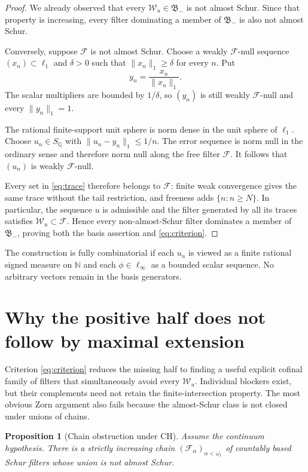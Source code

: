 \documentclass[10pt]{article}
\newtheorem{proposition}[theorem]{Proposition}
\newcommand{\N}{\mathbb N}
\newcommand{\Q}{\mathbb Q}
\newcommand{\F}{\mathcal F}
\newcommand{\W}{\mathcal W}
\newcommand{\ellone}{\ell_1}
\begin{document}
\begin{proof}
We already observed that every $\W_u\in\mathfrak B_-$ is not almost Schur.
Since that property is increasing, every filter dominating a member of
$\mathfrak B_-$ is also not almost Schur.

Conversely, suppose $\F$ is not almost Schur.  Choose a weakly
$\F$-null sequence $(x_n)\subset\ellone$ and $\delta>0$ such that
$\|x_n\|_1\ge\delta$ for every $n$.  Put
\[
 y_n=\frac{x_n}{\|x_n\|_1}.
\]
The scalar multipliers are bounded by $1/\delta$, so $(y_n)$ is still weakly
$\F$-null and every $\|y_n\|_1=1$.

The rational finite-support unit sphere is norm dense in the unit sphere of
$\ellone$.  Choose $u_n\in S_{\Q}$ with
\(\|u_n-y_n\|_1\le1/n\).  The error sequence is norm null in the ordinary
sense and therefore norm null along the free filter $\F$.  It follows that
$(u_n)$ is weakly $\F$-null.

Every set in \eqref{eq:trace} therefore belongs to $\F$: finite weak
convergence gives the same trace without the tail restriction, and freeness
adds $\{n:n\ge N\}$.  In particular, the sequence $u$ is admissible and the
filter generated by all its traces satisfies $\W_u\subset\F$.  Hence every
non-almost-Schur filter dominates a member of $\mathfrak B_-$, proving both
the basis assertion and \eqref{eq:criterion}.
\end{proof}

The construction is fully combinatorial if each $u_n$ is viewed as a finite
rational signed measure on $\N$ and each $\phi\in\ell_\infty$ as a bounded
scalar sequence.  No arbitrary vectors remain in the basis generators.

\section*{Why the positive half does not follow by maximal extension}

Criterion \eqref{eq:criterion} reduces the missing half to finding a useful
explicit cofinal family of filters that simultaneously avoid every
$\W_u$.  Individual blockers exist, but their complements need not retain the
finite-intersection property.  The most obvious Zorn argument also fails
because the almost-Schur class is not closed under unions of chains.

\begin{proposition}[Chain obstruction under CH]\label{prop:chain}
Assume the continuum hypothesis.  There is a strictly increasing chain
$(\F_\alpha)_{\alpha<\omega_1}$ of countably based Schur filters whose union
is not almost Schur.
\end{proposition}
\end{document}
